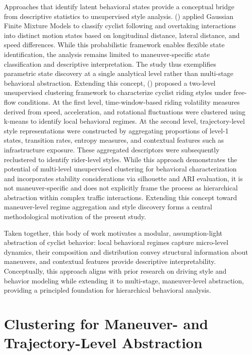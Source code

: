 Approaches that identify latent behavioral states provide a conceptual bridge from descriptive statistics to unsupervised style analysis. 
\citeauthor{mohammed_characterization_2019} (\citeyear{mohammed_characterization_2019}) applied Gaussian Finite Mixture Models to classify cyclist following and overtaking interactions into distinct motion states based on longitudinal distance, lateral distance, and speed differences. While this probabilistic framework enables flexible state identification, the analysis remains limited to maneuver-specific state classification and descriptive interpretation. The study thus exemplifies parametric state discovery at a single analytical level rather than multi-stage behavioral abstraction.
Extending this concept, \citeauthor{bachir_identifying_2025} (\citeyear{bachir_identifying_2025}) proposed a two-level unsupervised clustering framework to characterize cyclist riding styles under free-flow conditions. At the first level, time-window-based riding volatility measures derived from speed, acceleration, and rotational fluctuations were clustered using k-means to identify local behavioral regimes. At the second level, trajectory-level style representations were constructed by aggregating proportions of level-1 states, transition rates, entropy measures, and contextual features such as infrastructure exposure. These aggregated descriptors were subsequently reclustered to identify rider-level styles. While this approach demonstrates the potential of multi-level unsupervised clustering for behavioral characterization and incorporates stability considerations via silhouette and ARI evaluation, it is not maneuver-specific and does not explicitly frame the process as hierarchical abstraction within complex traffic interactions. Extending this concept toward maneuver-level regime aggregation and style discovery forms a central methodological motivation of the present study.

Taken together, this body of work motivates a modular, assumption-light abstraction of cyclist behavior: local behavioral regimes capture micro-level dynamics, their composition and distribution convey structural information about maneuvers, and contextual features provide descriptive interpretability. Conceptually, this approach aligns with prior research on driving style and behavior modeling while extending it to multi-stage, maneuver-level abstraction, providing a principled foundation for hierarchical behavioral analysis.

\fi

\section{Clustering for Maneuver- and Trajectory-Level Abstraction}

